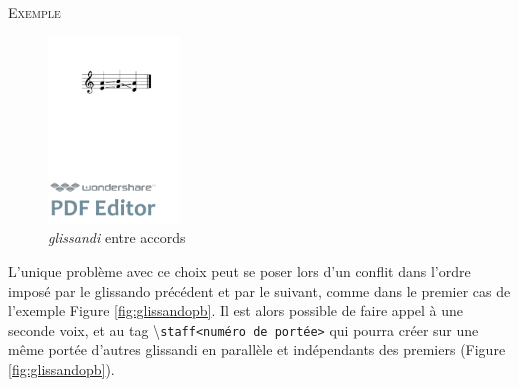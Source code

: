 \documentclass{article}
\newenvironment{gmncode}	{\vspace{-2mm}\small\verbatim}{\endverbatim\vspace{-2mm}}
\newcommand{\code}[1]		{{\small \texttt{#1}}}
\newcommand{\guidotag}[1]	{\textbackslash\code{#1}}
\newcommand{\exemple}		{\vspace{2mm}\hspace*{-6mm}\textsc{Exemple}}
\begin{document}
\exemple
\begin{gmncode}
[ \glissando({e,a} {f,b} {a,d}) ]
\end{gmncode}

\begin{figure}[h]
\begin{center}
\includegraphics[width=35mm]{img/glissandosimple.pdf}
\caption{\emph{glissandi} entre accords}
\label{fig:glissandosimple}
\end{center}
\end{figure}

L'unique problème avec ce choix peut se poser lors d'un conflit dans l'ordre imposé par le glissando précédent et par le suivant, comme dans le premier cas de l'exemple Figure \ref{fig:glissandopb}. Il est alors possible de faire appel à une seconde voix, et au tag \guidotag{staff\textless{}numéro de portée\textgreater{}} qui pourra créer sur une même portée d'autres glissandi en parallèle et indépendants des premiers (Figure \ref{fig:glissandopb}).
\end{document}

